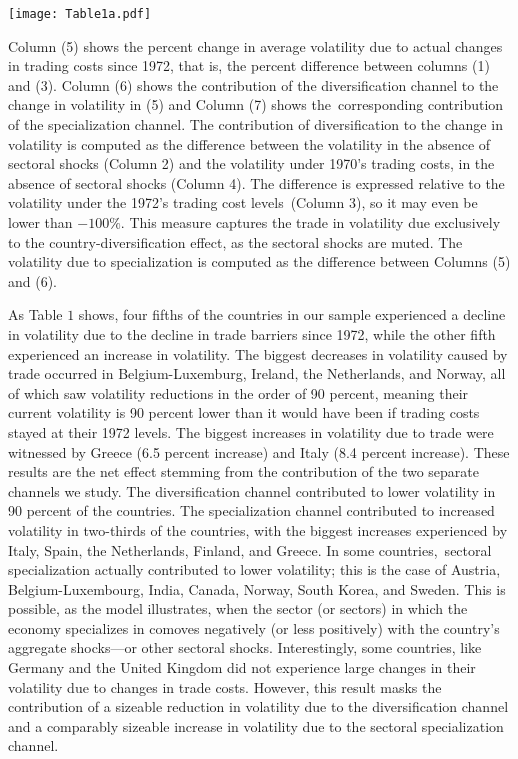 \documentclass[12pt]{article}
\begin{document}
\begin{table}[h]
\caption{Baseline and counterfactual changes in volatility (measured as
variance) due to changes in trading costs. Baseline calibration ($\protect%
\theta =4$)}\centering\texttt{[image: Table1a.pdf]}
\end{table}

Column (5) shows the percent change in average volatility due to actual
changes in trading costs since 1972, that is, the percent difference between
columns (1) and (3). Column (6) shows the contribution of the
diversification channel to the change in volatility in (5) and Column (7)
shows the\ corresponding contribution of the specialization channel. The
contribution of diversification to the change in volatility is computed as
the difference between the volatility in the absence of sectoral shocks
(Column 2) and the volatility under 1970's trading costs, in the absence of
sectoral shocks (Column 4). The difference is expressed relative to the
volatility under the 1972's trading cost levels\ (Column 3), so it may even
be lower than $-100\%$. This measure captures the trade in volatility due
exclusively to the country-diversification effect, as the sectoral shocks
are muted. The volatility due to specialization is computed as the
difference between Columns (5) and (6).

As Table $1$ shows, four fifths of the countries in our sample experienced a
decline in volatility due to the decline in trade barriers since 1972, while
the other fifth experienced an increase in volatility. The biggest decreases
in volatility caused by trade occurred in Belgium-Luxemburg, Ireland, the
Netherlands, and Norway, all of which saw volatility reductions in the order
of 90 percent, meaning their current volatility is 90 percent lower than it
would have been if trading costs stayed at their 1972 levels. The biggest
increases in volatility due to trade were witnessed by Greece (6.5 percent
increase) and Italy (8.4 percent increase). These results are the net effect
stemming from the contribution of the two separate channels we study. The
diversification channel contributed to lower volatility in 90 percent of the
countries. The specialization channel contributed to increased volatility in
two-thirds of the countries, with the biggest increases experienced by
Italy, Spain, the Netherlands, Finland, and Greece. In some countries,\
sectoral specialization actually contributed to lower volatility; this is
the case of Austria, Belgium-Luxembourg, India, Canada, Norway, South Korea,
and Sweden. This is possible, as the model illustrates, when the sector (or
sectors) in which the economy specializes in comoves negatively (or less
positively) with the country's aggregate shocks---or other sectoral shocks.
Interestingly, some countries, like Germany and the United Kingdom did not
experience large changes in their volatility due to changes in trade costs.
However, this result masks the contribution of a sizeable reduction in
volatility due to the diversification channel and a comparably sizeable
increase in volatility due to the sectoral specialization channel.
\end{document}
